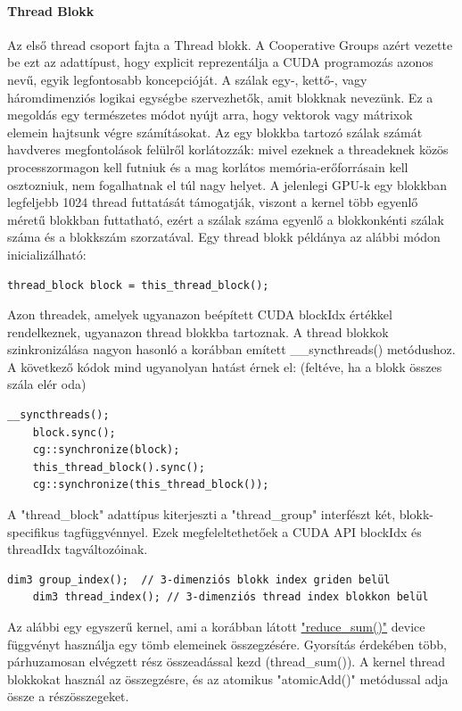 \paragraph{Thread Blokk}
Az első thread csoport fajta a Thread blokk. A Cooperative Groups azért vezette be ezt az adattípust, hogy explicit reprezentálja a CUDA programozás azonos nevű, egyik legfontosabb koncepcióját. A szálak egy-, kettő-, vagy háromdimenziós logikai egységbe szervezhetők, amit blokknak nevezünk. Ez a megoldás egy természetes módot nyújt arra, hogy vektorok vagy mátrixok elemein hajtsunk végre számításokat.
Az egy blokkba tartozó szálak számát havdveres megfontolások felülről korlátozzák: mivel ezeknek a threadeknek közös processzormagon kell futniuk és a mag korlátos memória-erőforrásain kell osztozniuk, nem fogalhatnak el túl nagy helyet. A jelenlegi GPU-k egy blokkban legfeljebb 1024 thread futtatását támogatják, viszont a kernel több egyenlő méretű blokkban futtatható, ezért a szálak száma egyenlő a blokkonkénti szálak száma és a blokkszám szorzatával.
Egy thread blokk példánya az alábbi módon inicializálható:
\begin{lstlisting}[style=CStyle]
	thread_block block = this_thread_block();
\end{lstlisting}

Azon threadek, amelyek ugyanazon beépített CUDA blockIdx értékkel rendelkeznek, ugyanazon thread blokkba tartoznak. A thread blokkok szinkronizálása nagyon hasonló a korábban emített \_\_syncthreads() metódushoz. A következő kódok mind ugyanolyan hatást érnek el: (feltéve, ha a blokk összes szála elér oda)
\begin{lstlisting}[style=CStyle]
	__syncthreads();
	block.sync();
	cg::synchronize(block);
	this_thread_block().sync();
	cg::synchronize(this_thread_block());
\end{lstlisting}

A "thread\_block" adattípus kiterjeszti a "thread\_group" interfészt két, blokk-specifikus tagfüggvénnyel. Ezek megfeleltethetőek a CUDA API blockIdx és threadIdx tagváltozóinak.
\begin{lstlisting}[style=CStyle]
	dim3 group_index();  // 3-dimenziós blokk index griden belül
	dim3 thread_index(); // 3-dimenziós thread index blokkon belül
\end{lstlisting}

Az alábbi egy egyszerű kernel, ami a korábban látott \hyperlink{reducesum}{"reduce\_sum()"} device függvényt használja egy tömb elemeinek összegzésére. Gyorsítás érdekében több, párhuzamosan elvégzett rész összeadással kezd (thread\_sum()). A kernel thread blokkokat használ az összegzésre, és az atomikus "atomicAdd()" metódussal adja össze a részösszegeket.

